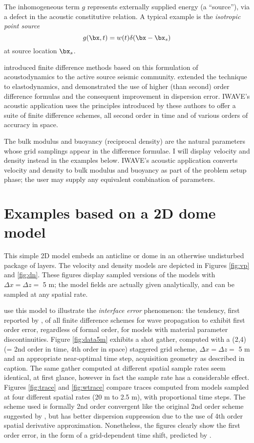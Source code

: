 The inhomogeneous term $g$ represents externally supplied energy (a
``source''), via a defect in the acoustic constitutive relation. A
typical example is the {\em isotropic point source}
\[
g(\bx,t) = w(t) \delta(\bx-\bx_s)
\]
at source location $\bx_s$.

\cite{Vir:84} introduced finite difference methods based on this
formulation of acoustodynamics to the active source seismic
community. \cite{Vir:86} extended the technique to elastodynamics, and
\cite{Lev:88} demonstrated the use of higher (than second) order
difference formulas and the consequent improvement in dispersion
error.  IWAVE's acoustic application uses the principles introduced by
these authors to offer a suite of finite difference schemes, all
second order in time and of various orders of accuracy in space.

The bulk modulus and buoyancy (reciprocal density) are the natural
parameters whose grid samplings appear in the difference formulae. I will
display velocity and density instead in the examples below. IWAVE's acoustic application
converts velocity and density to bulk modulus and buoyancy as part of
the problem setup phase; the user may supply any equivalent combination of parameters.

\section{Examples based on a 2D dome model}

This simple 2D model embeds an anticline or dome in an otherwise
undisturbed package of layers. The velocity and density models are
depicted in Figures \ref{fig:vp} and \ref{fig:dn}. These
figures display sampled versions of the models with $\Delta x = \Delta
z = $ 5 m; the model fields are actually given analytically, and can
be sampled at any spatial rate.

\cite{SymesVdovina:09} use this model to illustrate the {\em
  interface error} phenomenon: the tendency, first reported by
\cite{Brown:84}, of all finite difference schemes for wave
propagation to exhibit first order error, regardless of formal order,
for models with material parameter discontinuities. 
Figure \ref{fig:data5m} exhibits a shot gather, computed with a (2,4) (= 2nd order in time,
4th order in space) staggered grid scheme, $\Delta
x = \Delta z = $ 5 m and an appropriate near-optimal time step, acquisition geometry as described in
caption. The same gather computed at different spatial sample rates
seem identical, at first glance, however in fact the sample rate has a considerable effect. Figures
\ref{fig:trace} and \ref{fig:wtrace} compare traces computed from models sampled
at four different spatial rates (20 m to 2.5 m), with proportional
time steps. The scheme used is formally 2nd order
convergent like the original 2nd order scheme suggested by
\cite{Vir:84}, but has better dispersion suppression due to the use of
4th order spatial derivative approximation. Nonetheless,
the figures clearly show the first order error, in the form of a
grid-dependent time shift, predicted by \cite{Brown:84}. 

